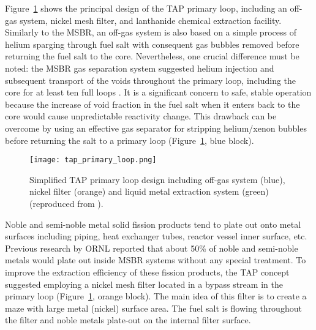 Figure~\ref{fig:tap-reproc} shows the principal design of the \gls{TAP} 
primary loop, including an off-gas system, nickel mesh filter, and lanthanide 
chemical extraction facility. Similarly to the \gls{MSBR}, an off-gas system 
is also based on a simple process of helium sparging through fuel salt with 
consequent gas bubbles removed before returning the fuel salt to the core. 
Nevertheless, one crucial difference must be noted: the \gls{MSBR} gas 
separation system suggested helium injection and subsequent transport of the 
voids throughout the primary loop, including the core for at least ten full 
loops \cite{robertson_conceptual_1971}. It is a significant concern to safe, 
stable operation because the increase of void fraction in the fuel salt when 
it enters back to the core would cause unpredictable reactivity change. This 
drawback can be overcome by using an effective gas separator for stripping 
helium/xenon bubbles before returning the salt to a primary loop 
(Figure~\ref{fig:tap-reproc}, blue block). 
\begin{figure}[htp!] %
	\centering
	\texttt{[image: tap\_primary\_loop.png]}
	\caption{Simplified \gls{TAP} primary loop design including off-gas system 
	(blue), 
		nickel filter (orange) and liquid metal extraction system (green) 
		(reproduced from \cite{transatomic_power_transatomic_2019}).}
	\label{fig:tap-reproc}
\end{figure}

Noble and semi-noble metal solid fission products tend to plate out onto metal 
surfaces including piping, heat exchanger tubes, reactor vessel inner surface, 
etc. Previous research by \gls{ORNL} \cite{robertson_conceptual_1971} reported 
that about 50\% of noble and semi-noble metals would plate out inside 
\gls{MSBR} systems without any special treatment. To improve the extraction 
efficiency of these fission products, the \gls{TAP} concept suggested 
employing a nickel mesh filter located in a bypass stream in the primary loop 
(Figure~\ref{fig:tap-reproc}, orange block). The main idea of this filter is 
to create a maze with large metal (nickel) surface area. The fuel salt is  
flowing throughout the filter and noble metals plate-out on the internal  
filter surface. 

